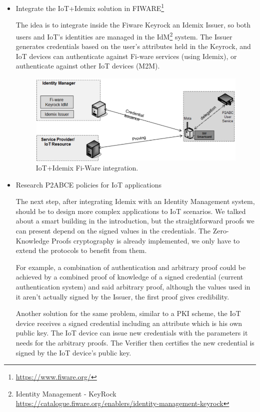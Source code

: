 \documentclass[journal]{IEEEtran}
\begin{document}
\begin{itemize}
	\item Integrate the IoT+Idemix solution in FIWARE\footnote{\url{https://www.fiware.org/}}
	
	The idea is to integrate inside the Fiware Keyrock an Idemix Issuer, so both users and IoT's identities are managed in the IdM\footnote{Identity Management - KeyRock \url{https://catalogue.fiware.org/enablers/identity-management-keyrock}} system. The Issuer generates credentials based on the user’s attributes held in the Keyrock, and IoT devices can authenticate against Fi-ware services (using Idemix), or authenticate against other IoT devices (M2M).
	
	\begin{figure}[bth]
		\begin{center}
			\includegraphics[width=\linewidth]{gfx/fiware}
			\caption{IoT+Idemix Fi-Ware integration.}
		\end{center}
		\label{fig:fiware}
	\end{figure}
	
	\item Research P2ABCE policies for IoT applications
	
	The next step, after integrating Idemix with an Identity Management system, should be to design more complex applications to IoT scenarios. We talked about a smart building in the introduction, but the straightforward proofs we can present depend on the signed values in the credentials. The Zero-Knowledge Proofs cryptography is already implemented, we only have to extend the protocols to benefit from them.
	
	For example, a combination of authentication and arbitrary proof could be achieved by a combined proof of knowledge of a signed credential (current authentication system) and said arbitrary proof, although the values used in it aren't actually signed by the Issuer, the first proof gives credibility.
	
	Another solution for the same problem, similar to a PKI scheme, the IoT device receives a signed credential including an attribute which is his own public key. The IoT device can issue new credentials with the parameters it needs for the arbitrary proofs. The Verifier then certifies the new credential is signed by the IoT device's public key.
	
\end{itemize}
\end{document}
